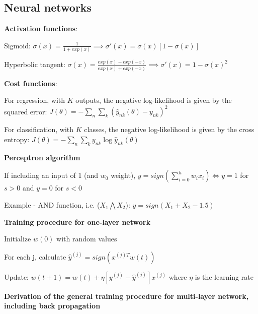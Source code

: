 \documentclass[letterpaper,fontsize=5pt]{scrartcl}
\renewenvironment{enumerate}[1]{\begin{compactenum}#1}{\end{compactenum}}
\theoremstyle{definition}
\begin{document}
\begin{multicols}{2}
\section{Neural networks}
	\begin{enumerate}
		\item \textbf{Activation functions}:
			\begin{enumerate}
				\item Sigmoid: $\sigma(x) = \frac{1}{1 + exp(x)} \implies \sigma'(x) = \sigma(x)[1-\sigma(x)]$
				\item Hyperbolic tangent: $\sigma(x) = \frac{exp(x) - exp(-x)}{exp(x) + exp(-x)} \implies \sigma'(x) = 1-\sigma(x)^2 $
			\end{enumerate}
		\item \textbf{Cost functions}:
			\begin{enumerate}
				\item For regression, with $K$ outputs, the negative log-likelihood is given by the squared error: $J(\theta) = -\sum_n \sum_k (\hat{y}_{nk}(\theta) - y_{nk})^2 $
				\item For classification, with $K$ classes, the negative log-likelihood is given by the cross entropy: $J(\theta) = -\sum_n \sum_k y_{nk} \log \hat{y}_{nk}(\theta) $
			\end{enumerate}
		\item \textbf{Perceptron algorithm}
			\begin{enumerate}
				\item If including an input of 1 (and $w_0$ weight), $y = sign(\sum\limits_{i=0}^h w_i x_i) \iff y = 1$ for $s > 0$ and $y = 0$ for $s < 0$
				\item Example - AND function, i.e. ($X_1 \bigwedge X_2$): $y = sign(X_1 + X_2 - 1.5)$
			\end{enumerate}
		\item \textbf{Training procedure for one-layer network}
			\begin{enumerate}
				\item Initialize $w(0)$ with random values
				\item For each j, calculate $\hat{y}^{(j)} = sign(x^{(j)T}w(t))$
				\item Update: $w(t+1) = w(t) + \eta [y^{(j)} - \hat{y}^{(j)}]x^{(j)} $ where $\eta$ is the learning rate
			\end{enumerate}
		\item \textbf{Derivation of the general training procedure for multi-layer network, including back propagation}
			\begin{enumerate}

\end{enumerate}
\end{enumerate}
\end{multicols}
\end{document}
